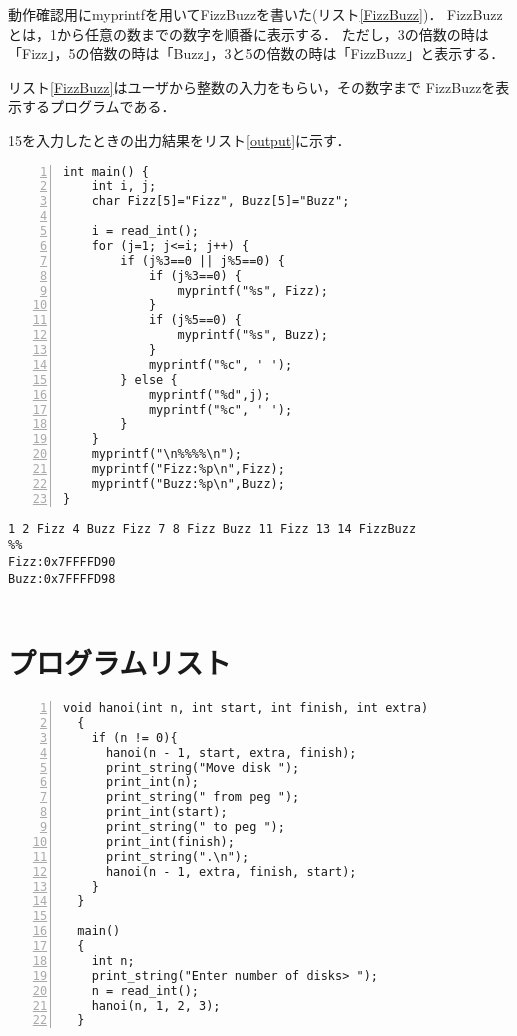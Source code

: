 \documentclass[11pt]{jarticle}
\begin{document}
動作確認用にmyprintfを用いてFizzBuzzを書いた(リスト\ref{FizzBuzz})．
FizzBuzzとは，1から任意の数までの数字を順番に表示する．
ただし，3の倍数の時は「Fizz」，5の倍数の時は「Buzz」，3と5の倍数の時は「FizzBuzz」と表示する．

リスト\ref{FizzBuzz}はユーザから整数の入力をもらい，その数字まで
FizzBuzzを表示するプログラムである．

15を入力したときの出力結果をリスト\ref{output}に示す．

\begin{lstlisting}[caption=FizzBuzz,label=FizzBuzz,numbers=left]  
int main() {
    int i, j;
    char Fizz[5]="Fizz", Buzz[5]="Buzz";

    i = read_int();
    for (j=1; j<=i; j++) {
        if (j%3==0 || j%5==0) {
            if (j%3==0) {
                myprintf("%s", Fizz);
            }
            if (j%5==0) {
                myprintf("%s", Buzz);
            }
            myprintf("%c", ' ');
        } else {
            myprintf("%d",j);
            myprintf("%c", ' ');
        }
    }
    myprintf("\n%%%%\n");
    myprintf("Fizz:%p\n",Fizz);
    myprintf("Buzz:%p\n",Buzz);
}
\end{lstlisting}

\begin{lstlisting}[caption=出力結果,label=output]
1 2 Fizz 4 Buzz Fizz 7 8 Fizz Buzz 11 Fizz 13 14 FizzBuzz
%%
Fizz:0x7FFFFD90
Buzz:0x7FFFFD98
  
\end{lstlisting}

\section{プログラムリスト} \label{sec:program}

\begin{lstlisting}[caption=hanoi.c,label=hanoi,numbers=left]
  void hanoi(int n, int start, int finish, int extra)
  {
    if (n != 0){
      hanoi(n - 1, start, extra, finish);
      print_string("Move disk ");
      print_int(n);
      print_string(" from peg ");
      print_int(start);
      print_string(" to peg ");
      print_int(finish);
      print_string(".\n");
      hanoi(n - 1, extra, finish, start);
    }
  }
  
  main()
  {
    int n;
    print_string("Enter number of disks> ");
    n = read_int();
    hanoi(n, 1, 2, 3);
  }
\end{lstlisting}
\end{document}
